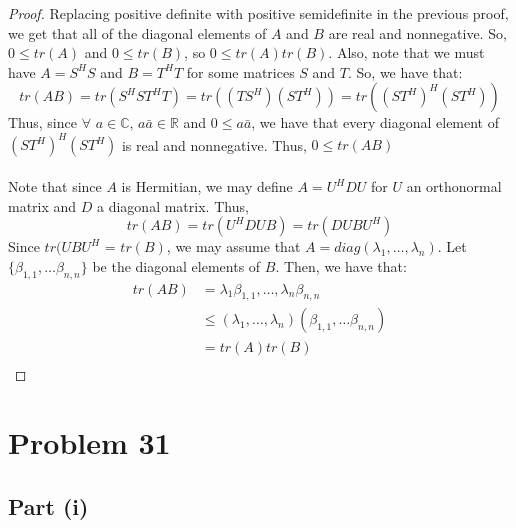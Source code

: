 \documentclass{article}
\begin{document}
\begin{proof}
Replacing positive definite with positive semidefinite in the previous proof, we get that all of the diagonal elements of $A$ and $B$ are real and nonnegative. So, $0 \leq tr(A)$ and $0 \leq tr(B)$, so $0 \leq tr(A)tr(B)$. Also, note that we must have $A = S^{H}S$ and $B = T^{H}T$ for some matrices $S$ and $T$. So, we have that:
$$tr(AB) = tr(S^{H}ST^{H}T) = tr((TS^{H})(ST^{H})) = tr((ST^{H})^{H}(ST^{H}))$$
Thus, since $\forall$ $a \in \mathbb{C}$, $a\bar a \in \mathbb{R}$ and $0 \leq a\bar a$, we have that every diagonal element of $(ST^{H})^{H}(ST^{H})$ is real and nonnegative. Thus, $0 \leq tr(AB)$ \\
\\
Note that since $A$ is Hermitian, we may define $A = U^{H}DU$ for $U$ an orthonormal matrix and $D$ a diagonal matrix. Thus,
$$tr(AB) = tr(U^{H}DUB) = tr(DUBU^{H})$$
Since $tr(UBU^{H}$ = $tr(B)$, we may assume that $A = diag(\lambda_1, \dots, \lambda_n)$. Let $\{\beta_{1, 1}, \dots \beta_{n, n}\}$ be the diagonal elements of $B$. Then, we have that:
\begin{align*}
tr(AB) &= \lambda_1\beta_{1, 1}, \dots, \lambda_n\beta_{n, n} \\
&\leq (\lambda_1, \dots, \lambda_n)(\beta_{1, 1}, \dots \beta_{n, n}) \\
&= tr(A)tr(B) \\
\end{align*}
\end{proof}


\section*{Problem 31}

\subsection*{Part (i)}
\end{document}
